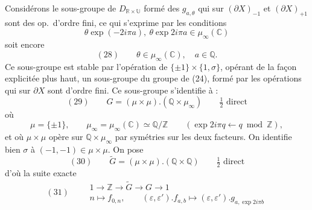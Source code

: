 \documentclass[11pt,a4paper]{article}
\begin{document}
Considérons le sous-groupe de \struck{\ill{}} $D_{\mathbb{R}\times\mathbb{U}}$ formé des $g_{a,\theta}$ qui  sur $(\partial X)_{-1}$ et $(\partial X)_{+1}$ sont des  op.\ d'ordre fini, ce qui s'exprime par les conditions
\[
\theta\exp(-2i\pi a),\ \theta\exp 2i\pi a\in\mu_\infty(\mathbb{C})
\]
soit encore
\[
(28)\qquad \theta\in\mu_\infty(\mathbb{C}),\quad a\in\mathbb{Q}.
\]
Ce sous-groupe est stable par l'opération de $\{\pm1\}\times\{1,\sigma\}$, opérant de la façon explicitée plus haut, \ill{} \ill{} un sous-groupe du groupe de (24), formé  par les opérations  qui sur $\partial X$ sont d'ordre fini. Ce sous-groupe \struck{\ill{}} s'identifie à :
\[
(29)\qquad G=(\mu\times\mu).(\mathbb{Q}\times\mu_\infty)\qquad \tfrac12\text{ direct}
\]
où
\[
\mu=\{\pm1\},\qquad \mu_\infty=\mu_\infty(\mathbb{C})\simeq\mathbb{Q}/\mathbb{Z}\qquad
(\exp 2i\pi q \longleftarrow q \bmod \mathbb{Z}),
\]
et où $\mu\times\mu$ opère sur $\mathbb{Q}\times\mu_\infty$ par symétries sur les deux facteurs. On identifie bien $\sigma$ à $(-1,-1)\in\mu\times\mu$. On pose
\[
(30)\qquad \widetilde{G}=(\mu\times\mu).(\mathbb{Q}\times\mathbb{Q})\qquad\tfrac12\text{ direct}
\]
d'où la suite exacte
\[
(31)\qquad
\begin{gathered}
1\longrightarrow\mathbb{Z}\longrightarrow\widetilde{G}\longrightarrow G\longrightarrow 1\\
n\longmapsto f_{0,n},\qquad (\varepsilon,\varepsilon').f_{a,b}\longmapsto(\varepsilon,\varepsilon').g_{a,\exp 2i\pi b}
\end{gathered}
\]
\end{document}
